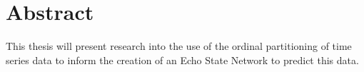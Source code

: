 \chapter*{Abstract}

This thesis will present research into the use of the ordinal partitioning of time series data to inform the creation of an Echo State Network to predict this data.